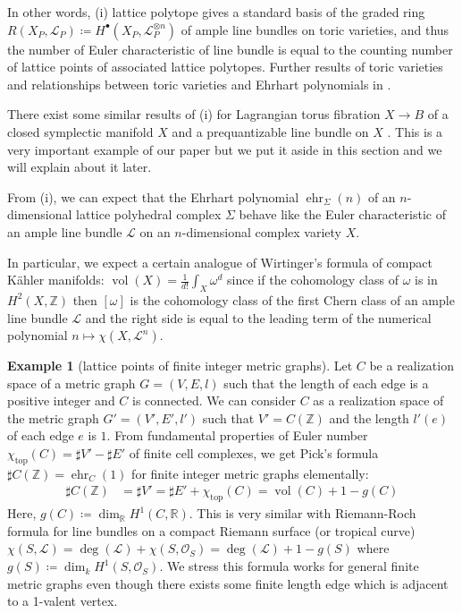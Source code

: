 \documentclass[a4paper,dvipdfmx,reqno,12pt]{amsart}
\theoremstyle{definition}
\newtheorem{Eg}[Thm]{Example}
\newcommand{\deq}{\coloneqq}
\newcommand{\R}{\mathbb{R}}%
\newcommand{\Z}{\mathbb{Z}}%
\newcommand{\mcal}[1]{\mathcal{#1}}%
\newcommand{\opn}[1]{\operatorname{#1}}
\numberwithin{equation}{section}
\begin{document}
In other words, (i) lattice polytope gives a standard basis of the graded ring $R(X_{P},\mcal{L}_P)\deq H^{\bullet}(X_{P},\mcal{L}_P^{\otimes n})$  of ample line bundles on toric varieties, and thus the number of Euler characteristic of line bundle is equal to the counting number of lattice points of associated lattice polytopes. Further results of toric varieties and relationships between toric varieties and Ehrhart polynomials in \cite{coxToricVarieties2011a}.

There exist some similar results of (i) for Lagrangian torus fibration $X \to B$ of a closed symplectic manifold $X$ and a prequantizable line bundle on $X$ \cite{MR1461965}. This is a very important example of our paper but we put it aside in this section and we will explain about it later.

From (i), we can expect that the Ehrhart polynomial
$\opn{ehr}_{\Sigma}(n)$ of an $n$-dimensional lattice polyhedral complex
$\Sigma$ behave like the Euler characteristic of
an ample line bundle $\mcal{L}$ on
an $n$-dimensional complex variety $X$.

In particular, we expect a certain analogue of Wirtinger's formula of compact K\"ahler manifolds: $\opn{vol}(X)=\frac{1}{d!}\int_{X}\omega^{d}$ since if the cohomology class of $\omega$ is in $H^{2}(X,\Z)$ then $[\omega]$ is the cohomology class of the first Chern class of an ample line bundle $\mcal{L}$ and the right side is equal to the leading term of the numerical polynomial $n\mapsto \chi(X,\mcal{L}^{n})$.

\begin{Eg}[lattice points of finite integer metric graphs]
  Let $C$ be a realization space of a metric graph $G=(V,E,l)$ such that the length of each edge is a positive integer and $C$ is connected.
  We can consider $C$ as a realization space of the metric graph $G'=(V',E',l')$ such that $V'=C(\Z)$ and the length $l'(e)$ of each edge $e$ is $1$. From fundamental properties of Euler number $\chi_{\opn{top}}(C)=\sharp V'-\sharp E'$ of finite cell complexes, we get Pick's formula $\sharp C(\Z)=\opn{ehr}_{C}(1)$ for finite integer metric graphs elementally:
  \begin{align}
    \sharp C(\Z) & =\sharp V'=\sharp E'+\chi_{\opn{top}}(C)=\opn{vol}(C)+1-g(C)
  \end{align}
  Here, $g(C)\deq \dim_{\R} H^{1}(C,\R)$.
  This is very similar with Riemann-Roch formula for line bundles on a compact Riemann surface (or tropical curve) $\chi(S,\mcal{L})=\opn{deg}(\mcal{L})+\chi(S,\mcal{O}_S)=\opn{deg}(\mcal{L})+1-g(S)$ where $g(S)\deq \dim_k H^1(S,\mcal{O}_S)$. We stress this formula works for general finite metric graphs even though there exists some finite length edge which is adjacent to a 1-valent vertex.
\end{Eg}
\end{document}
